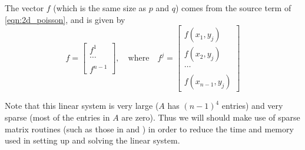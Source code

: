 The vector $f$ (which is the same size as $p$ and $q$) comes from the source term of \eqref{eqn:2d_poisson}, and is given by 
\[f = \begin{bmatrix} f^1 \\ \ldots \\ \\ f^{n-1} \end{bmatrix}, \quad  \text{where} \quad f^j = \begin{bmatrix} f(x_1,y_j) \\ f(x_2,y_j) \\ \ldots \\ \\ f(x_{n-1},y_j) \end{bmatrix}\]

Note that this linear system is very large ($A$ has $(n-1)^4$ entries) and very sparse (most of the entries in $A$ are zero). Thus we will should make use of sparse matrix routines (such as those in  and ) in order to reduce the time and memory used in setting up and solving the linear system.





%


